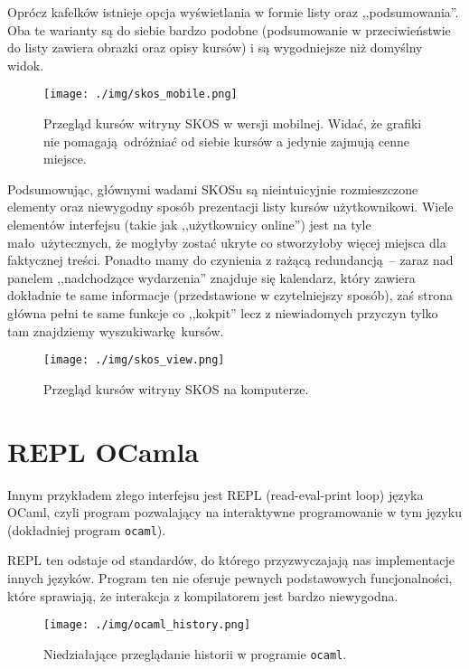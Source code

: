 \documentclass[12pt, a4paper, oneside]{report}
\begin{document}
Oprócz kafelków istnieje opcja wyświetlania w formie listy oraz 
,,podsumowania''. Oba te warianty są do siebie bardzo podobne (podsumowanie
w przeciwieństwie do listy zawiera obrazki oraz opisy kursów) i są wygodniejsze
niż domyślny widok.\\

\begin{figure}[H]
    \centering
    \texttt{[image: ./img/skos\_mobile.png]}
    \caption{Przegląd kursów witryny SKOS w wersji mobilnej. Widać, że grafiki
             nie pomagają odróżniać od siebie kursów a jedynie zajmują cenne
             miejsce.}
    \label{figure:skos-mobile}
\end{figure}


Podsumowując, głównymi wadami SKOSu są nieintuicyjnie rozmieszczone elementy
oraz niewygodny sposób prezentacji listy kursów użytkownikowi. Wiele elementów
interfejsu (takie jak ,,użytkownicy online'') jest na tyle mało użytecznych, że
mogłyby zostać ukryte co stworzyłoby więcej miejsca dla faktycznej treści.
Ponadto mamy do czynienia z rażącą redundancją -- zaraz nad panelem 
,,nadchodzące wydarzenia'' znajduje się kalendarz, który zawiera dokładnie
te same informacje (przedstawione w czytelniejszy sposób), zaś strona główna
pełni te same funkcje co ,,kokpit'' lecz z niewiadomych przyczyn tylko tam 
znajdziemy wyszukiwarkę kursów.


\begin{figure}
    \centering
    \texttt{[image: ./img/skos\_view.png]}
    \caption{Przegląd kursów witryny SKOS na komputerze.}
    \label{figure:skos-mobile}
\end{figure}

\chapter*{REPL OCamla}

Innym przykładem złego interfejsu jest REPL (read-eval-print loop) języka OCaml,
czyli program pozwalający na interaktywne programowanie w tym języku (dokładniej
program \texttt{ocaml}).

REPL ten odstaje od standardów, do którego przyzwyczajają nas implementacje
innych języków. Program ten nie oferuje pewnych podstawowych funcjonalności,
które sprawiają, że interakcja z kompilatorem jest bardzo niewygodna.

\begin{figure}[H]
    \centering
    \texttt{[image: ./img/ocaml\_history.png]}
    \caption{Niedziałające przeglądanie historii w programie \texttt{ocaml}.}
    \label{figure:ocaml-history}
\end{figure}
\end{document}
